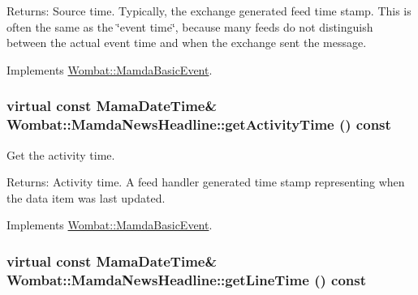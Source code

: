 \begin{Desc}
\item[Returns:]Source time. Typically, the exchange generated feed time stamp. This is often the same as the \char`\"{}event time\char`\"{}, because many feeds do not distinguish between the actual event time and when the exchange sent the message. \end{Desc}


Implements \hyperlink{classWombat_1_1MamdaBasicEvent_60b5d51f3799c4762090505ef5b213e9}{Wombat::Mamda\-Basic\-Event}.\hypertarget{classWombat_1_1MamdaNewsHeadline_cbd418bb5063ec7b524a50818f8a0893}{
\subsubsection[getActivityTime]{\setlength{\rightskip}{0pt plus 5cm}virtual const Mama\-Date\-Time\& Wombat::Mamda\-News\-Headline::get\-Activity\-Time () const}}
\label{classWombat_1_1MamdaNewsHeadline_cbd418bb5063ec7b524a50818f8a0893}


Get the activity time. 

\begin{Desc}
\item[Returns:]Activity time. A feed handler generated time stamp representing when the data item was last updated. \end{Desc}


Implements \hyperlink{classWombat_1_1MamdaBasicEvent_b3810afc69474ef3b192ee4c9307e714}{Wombat::Mamda\-Basic\-Event}.\hypertarget{classWombat_1_1MamdaNewsHeadline_e32eaf99ac790130beb93eb03ad2b562}{
\subsubsection[getLineTime]{\setlength{\rightskip}{0pt plus 5cm}virtual const Mama\-Date\-Time\& Wombat::Mamda\-News\-Headline::get\-Line\-Time () const}}
\label{classWombat_1_1MamdaNewsHeadline_e32eaf99ac790130beb93eb03ad2b562}


